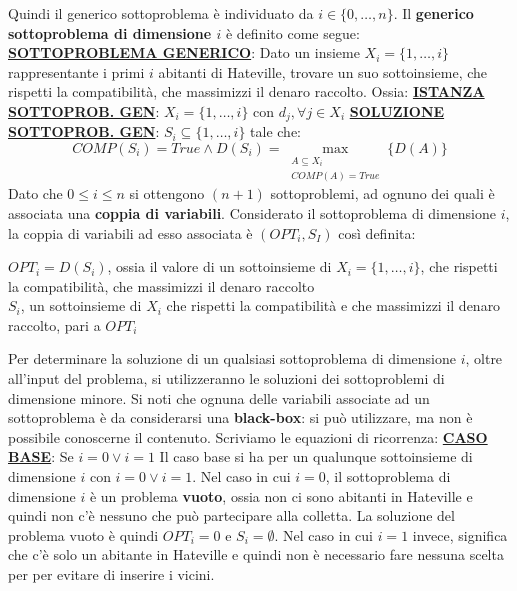 \documentclass[12pt]{article}
\begin{document}
Quindi il generico sottoproblema è individuato da $i \in \{0,\dots,n\}$.
Il \textbf{generico sottoproblema di dimensione $i$} è definito come segue: \newline
\textbf{\underline{SOTTOPROBLEMA GENERICO}}: Dato un insieme $X_i = \{1,\dots,i\}$ rappresentante i primi $i$ abitanti di
Hateville, trovare un suo sottoinsieme, che rispetti la compatibilità, che massimizzi il denaro raccolto. \newline
Ossia: \newline
\textbf{\underline{ISTANZA SOTTOPROB. GEN}}: $X_i = \{1,\dots,i\}$ con $d_j, \forall j \in X_i$ \newline
\textbf{\underline{SOLUZIONE SOTTOPROB. GEN}}: $S_i \subseteq \{1,\dots, i\}$ tale che:
$$COMP(S_i) = True \land D(S_i) = \max_{\substack{A \subseteq X_i\\ COMP(A) = True}}\{D(A)\}$$
Dato che $0 \leq i \leq n$ si ottengono $(n+1)$ sottoproblemi, ad ognuno dei quali è associata una \textbf{coppia di variabili}.
Considerato il sottoproblema di dimensione $i$, la coppia di variabili ad esso associata è $(OPT_i, S_I)$ così definita:
\begin{center}
    $OPT_i = D(S_i)$, ossia il valore di un sottoinsieme di $X_i = \{1,\dots,i\}$, che rispetti la compatibilità, che massimizzi il denaro raccolto \\
    $S_i$, un sottoinsieme di $X_i$ che rispetti la compatibilità e che massimizzi il denaro raccolto, pari a $OPT_i$
\end{center}
Per determinare la soluzione di un qualsiasi sottoproblema di dimensione $i$, oltre all'input del problema, si utilizzeranno le soluzioni dei sottoproblemi di dimensione minore.
Si noti che ognuna delle variabili associate ad un sottoproblema è da considerarsi una \textbf{black-box}: si può utilizzare, ma non è possibile conoscerne il contenuto.
Scriviamo le equazioni di ricorrenza: \newline
\textbf{\underline{CASO BASE}}: Se $i = 0 \vee i = 1$ \newline
Il caso base si ha per un qualunque sottoinsieme di dimensione $i$ con $i = 0 \vee i = 1$. Nel caso in cui $i = 0$, il sottoproblema di dimensione $i$ è un
problema \textbf{vuoto}, ossia non ci sono abitanti in Hateville e quindi non c'è nessuno che può partecipare alla colletta.
La soluzione del problema vuoto è quindi $OPT_i = 0$ e $S_i = \emptyset$.
Nel caso in cui $i = 1$ invece, significa che c'è solo un abitante in Hateville e quindi non è necessario fare nessuna scelta per per evitare di inserire i vicini.
\end{document}
